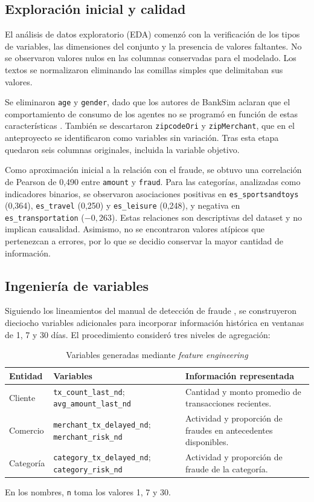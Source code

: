 \subsection{Exploración inicial y calidad}
El análisis de datos exploratorio (EDA) comenzó con la verificación de los tipos de variables, las dimensiones del conjunto y la presencia de valores faltantes. No se observaron valores nulos en las columnas conservadas para el modelado. Los textos se normalizaron eliminando las comillas simples que delimitaban sus valores.

Se eliminaron \texttt{age} y \texttt{gender}, dado que los autores de BankSim aclaran que el comportamiento de consumo de los agentes no se programó en función de estas características \cite{inproceedings}. También se descartaron \texttt{zipcodeOri} y \texttt{zipMerchant}, que en el anteproyecto se identificaron como variables sin variación. Tras esta etapa quedaron seis columnas originales, incluida la variable objetivo.

Como aproximación inicial a la relación con el fraude, se obtuvo una correlación de Pearson de 0,490 entre \texttt{amount} y \texttt{fraud}. Para las categorías, analizadas como indicadores binarios, se observaron asociaciones positivas en \texttt{es\_sportsandtoys} (0,364), \texttt{es\_travel} (0,250) y \texttt{es\_leisure} (0,248), y negativa en \texttt{es\_transportation} ($-0,263$). Estas relaciones son descriptivas del dataset y no implican causalidad. Asimismo, no se encontraron valores atípicos que pertenezcan a errores, por lo que se decidio conservar la mayor cantidad de información.

\subsection{Ingeniería de variables}
Siguiendo los lineamientos del manual de detección de fraude \cite{leborgne2022fraud}, se construyeron dieciocho variables adicionales para incorporar información histórica en ventanas de 1, 7 y 30 días. El procedimiento consideró tres niveles de agregación:

\begin{table}[!htbp]
\centering
\small
\caption{Variables generadas mediante \textit{feature engineering}}
\label{tab:features}
\begin{tabular}{@{}p{2.65cm}p{6.55cm}p{6cm}@{}}
\toprule
\textbf{Entidad} & \textbf{Variables} & \textbf{Información representada} \\
\midrule
Cliente & \texttt{tx\_count\_last\_nd}; \texttt{avg\_amount\_last\_nd} & Cantidad y monto promedio de transacciones recientes. \\
Comercio & \texttt{merchant\_tx\_delayed\_nd}; \texttt{merchant\_risk\_nd} & Actividad y proporción de fraudes en antecedentes disponibles. \\
Categoría & \texttt{category\_tx\_delayed\_nd}; \texttt{category\_risk\_nd} & Actividad y proporción de fraude de la categoría. \\
\bottomrule
\end{tabular}
\par\smallskip
{\footnotesize En los nombres, \texttt{n} toma los valores 1, 7 y 30.}
\end{table}

